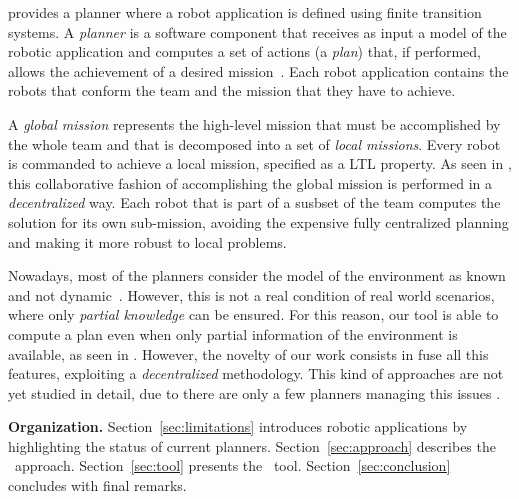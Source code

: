 
\toolName provides a planner where a robot application is defined using finite transition systems.
A \emph{planner} is  a software component that receives as input a model of the robotic application and computes  a set of actions (a \emph{plan}) that, if performed, allows the achievement of a desired mission~\cite{latombe2012robot}.
Each robot application contains the robots that conform the team and the mission that they have to achieve.

A \emph{global mission} represents the high-level mission that must be accomplished by the whole team \cite{kloetzer2011multi,loizou2005automated,quottrup2004multi} and that is decomposed into a set of \emph{local missions}\cite{schillinger2016decomposition,guo2015multi,guo2015multi,tumova2016multi}.
Every robot is commanded to achieve a local mission, specified as a LTL property.
As seen in \cite{tumova2016multi}, this collaborative fashion of accomplishing the global mission is performed in a \emph{decentralized} way.
Each robot that is part of a susbset of the team computes the solution for its own sub-mission, avoiding the expensive fully centralized planning and making it more robust to local problems.

Nowadays, most of the planners consider the model of the environment as known and not dynamic~\cite{7139412}. 
However, this is not a real condition of real world scenarios, where only \emph{partial knowledge} can be ensured.
For this reason, our tool is able to compute a plan even when only partial information of the environment is available, as seen in \cite{roy2006planning,du2012robot,diaz2001exploring}.
However, the novelty of our work consists in fuse all this features, exploiting a \emph{decentralized} methodology.
This kind of approaches are not yet studied in detail, due to there are only a few planners managing this issues \cite{guo2015multi}.

\textbf{Organization.} 
Section~\ref{sec:limitations} introduces robotic applications by highlighting the status of current planners.
Section~\ref{sec:approach} describes the \toolName\ approach.
Section~\ref{sec:tool} presents the \toolName\ tool.
Section~\ref{sec:conclusion} concludes with final remarks.